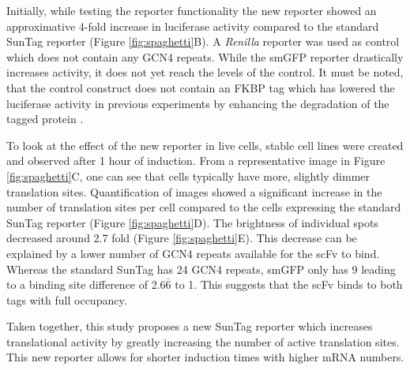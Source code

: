 Initially, while testing the reporter functionality the new reporter showed an approximative 4-fold increase in luciferase activity compared to the standard SunTag reporter (Figure \ref{fig:spaghetti}B).
A \textit{Renilla} reporter was used as control which does not contain any GCN4 repeats.
While the smGFP reporter drastically increases activity, it does not yet reach the levels of the control.
It must be noted, that the control construct does not contain an FKBP tag which has lowered the luciferase activity in previous experiments by enhancing the degradation of the tagged protein \cite{bonger_small_2011}.

To look at the effect of the new reporter in live cells, stable cell lines were created and observed after 1 hour of induction.
From a representative image in Figure \ref{fig:spaghetti}C, one can see that cells typically have more, slightly dimmer translation sites.
Quantification of images showed a significant increase in the number of translation sites per cell compared to the cells expressing the standard SunTag reporter (Figure \ref{fig:spaghetti}D).
The brightness of individual spots decreased around 2.7 fold (Figure \ref{fig:spaghetti}E).
This decrease can be explained by a lower number of GCN4 repeats available for the scFv to bind.
Whereas the standard SunTag has 24 GCN4 repeats, smGFP only has 9 leading to a binding site difference of 2.6$\overline{\mbox{6}}$ to 1.
This suggests that the scFv binds to both tags with full occupancy.

Taken together, this study proposes a new SunTag reporter which increases translational activity by greatly increasing the number of active translation sites.
This new reporter allows for shorter induction times with higher mRNA numbers.

